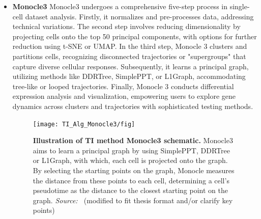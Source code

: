 \begin{itemize}
    \item \textbf{Monocle3}
    Monocle3 undergoes a comprehensive five-step process in single-cell dataset analysis\citep{cao2019monocle3}. Firstly, it normalizes and pre-processes data, addressing technical variations. The second step involves reducing dimensionality by projecting cells onto the top 50 principal components, with options for further reduction using t-SNE or UMAP. In the third step, Monocle 3 clusters and partitions cells, recognizing disconnected trajectories or "supergroups" that capture diverse cellular responses. Subsequently, it learns a principal graph, utilizing methods like DDRTree, SimplePPT, or L1Graph, accommodating tree-like or looped trajectories. Finally, Monocle 3 conducts differential expression analysis and visualization, empowering users to explore gene dynamics across clusters and trajectories with sophisticated testing methods.
    \begin{figure}[ht!]
    	\centering
    	\texttt{[image: TI\_Alg\_Monocle3/fig]}
    	\vspace{0.1cm}
    	\caption[Illustration of TI method Monocle3 schematic.]{\textbf{Illustration of TI method Monocle3 schematic.} Monocle3 aims to learn a principal graph by using SimplePPT, DDRTree or L1Graph, with which, each cell is projected onto the graph. By selecting the starting points on the graph, Monocle measures the distance from these points to each cell, determining a cell's pseudotime as the distance to the closest starting point on the graph. \emph{Source: ~\cite{cao2019monocle3}}(modified to fit thesis format and/or clarify key points)
    	}
    	\label{fig:TI_Alg_Monocle3}
    \end{figure}


\end{itemize}
